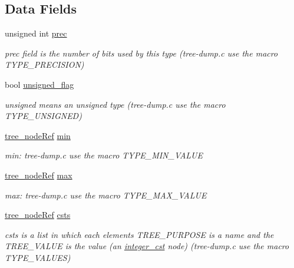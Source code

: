 \subsection*{Data Fields}
\begin{DoxyCompactItemize}
\item 
unsigned int \hyperlink{structenumeral__type_a54f9c97197f9310ed801c7ff1f5fd28b}{prec}
\begin{DoxyCompactList}\small\item\em prec field is the number of bits used by this type (tree-\/dump.\+c use the macro T\+Y\+P\+E\+\_\+\+P\+R\+E\+C\+I\+S\+I\+ON) \end{DoxyCompactList}\item 
bool \hyperlink{structenumeral__type_a150a6ae073923f3fdf8222afe2fe9caa}{unsigned\+\_\+flag}
\begin{DoxyCompactList}\small\item\em unsigned means an unsigned type (tree-\/dump.\+c use the macro T\+Y\+P\+E\+\_\+\+U\+N\+S\+I\+G\+N\+ED) \end{DoxyCompactList}\item 
\hyperlink{tree__node_8hpp_a6ee377554d1c4871ad66a337eaa67fd5}{tree\+\_\+node\+Ref} \hyperlink{structenumeral__type_acd66636f708fb157ce05a96cf5656100}{min}
\begin{DoxyCompactList}\small\item\em min\+: tree-\/dump.\+c use the macro T\+Y\+P\+E\+\_\+\+M\+I\+N\+\_\+\+V\+A\+L\+UE \end{DoxyCompactList}\item 
\hyperlink{tree__node_8hpp_a6ee377554d1c4871ad66a337eaa67fd5}{tree\+\_\+node\+Ref} \hyperlink{structenumeral__type_a0f0781dc2b36ed4e831d41671405e2ca}{max}
\begin{DoxyCompactList}\small\item\em max\+: tree-\/dump.\+c use the macro T\+Y\+P\+E\+\_\+\+M\+A\+X\+\_\+\+V\+A\+L\+UE \end{DoxyCompactList}\item 
\hyperlink{tree__node_8hpp_a6ee377554d1c4871ad66a337eaa67fd5}{tree\+\_\+node\+Ref} \hyperlink{structenumeral__type_a22fd7cd71fe2a66f8c4d5c5623234ae0}{csts}
\begin{DoxyCompactList}\small\item\em csts is a list in which each element\textquotesingle{}s T\+R\+E\+E\+\_\+\+P\+U\+R\+P\+O\+SE is a name and the T\+R\+E\+E\+\_\+\+V\+A\+L\+UE is the value (an \hyperlink{structinteger__cst}{integer\+\_\+cst} node) (tree-\/dump.\+c use the macro T\+Y\+P\+E\+\_\+\+V\+A\+L\+U\+ES) \end{DoxyCompactList}\end{DoxyCompactItemize}
